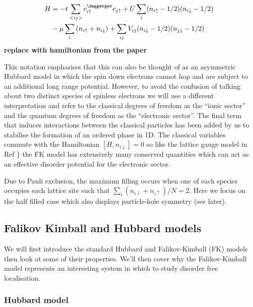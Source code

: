 \[\begin{aligned}
H &= -t \sum_{<ij>} c^\daggerger_{i\uparrow}c_{j\uparrow} + U \sum_{i} (n_{i \uparrow} - 1/2)( n_{i\downarrow} - 1/2) \\
       & - \mu \sum_i \left( n_{i \uparrow} + n_{i \downarrow} \right) + \sum_{ij} V_{ij} (n_{i\downarrow} - 1/2)(n_{j\downarrow} - 1/2) 
\end{aligned}\] \textbf{replace with hamiltonian from the paper}

This notation emphasises that this can also be thought of as an asymmetric Hubbard model in which the spin down electrons cannot hop and are subject to an additional long range potential. However, to avoid the confusion of talking about two distinct species of spinless electrons we will use a different interpretation and refer to the classical degrees of freedom as the ``ionic sector'' and the quantum degrees of freedom as the ``electronic sector''. The final term that induces interactions between the classical particles has been added by us to stabilise the formation of an ordered phase in 1D. The classical variables commute with the Hamiltonian \([H, n_{i\downarrow}] = 0\) so like the lattice gauge model in Ref \textcite{smithDisorderFreeLocalization2017}\} the FK model has extensively many conserved quantities which can act as an effective disorder potential for the electronic sector.

Due to Pauli exclusion, the maximum filling occurs when one of each species occupies each lattice site such that \(\sum_i (n_{i\downarrow} + n_{i\uparrow} )/ N = 2\). Here we focus on the half filled case which also displays particle-hole symmetry (see later).

\hypertarget{falikov-kimball-and-hubbard-models}{%
\subsection{Falikov Kimball and Hubbard models}\label{falikov-kimball-and-hubbard-models}}

We will first introduce the standard Hubbard and Falikov-Kimball (FK) models then look at some of their properties. We'll then cover why the Falikov-Kimball model represents an interesting system in which to study disorder free localisation.

\hypertarget{hubbard-model}{%
\subsubsection{Hubbard model}\label{hubbard-model}}

